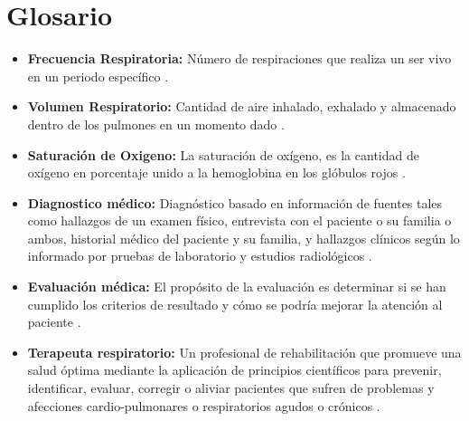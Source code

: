 \documentclass[12pt]{article}
\begin{document}
\newpage


\section*{Glosario}
\begin{itemize}
\item \textbf{Frecuencia Respiratoria:} Número de respiraciones que realiza un ser vivo en un periodo específico \cite{1}. 
\item \textbf{Volumen Respiratorio:} Cantidad de aire inhalado, exhalado y almacenado dentro de los pulmones en un momento dado \cite{2}.
\item \textbf{Saturación de Oxigeno:} La saturación de oxígeno, es la cantidad de oxígeno en porcentaje unido a la hemoglobina en los glóbulos rojos \cite{3}.
\item \textbf{Diagnostico médico:} Diagnóstico basado en información de fuentes tales como hallazgos de un examen físico, entrevista con el paciente o su familia o ambos, historial médico del paciente y su familia, y hallazgos clínicos según lo informado por pruebas de laboratorio y estudios radiológicos \cite{4}.
\item \textbf{Evaluación médica:} El propósito de la evaluación es determinar si se han cumplido los criterios de resultado y cómo se podría mejorar la atención al paciente \cite{4}.
\item \textbf{Terapeuta respiratorio:} Un profesional de rehabilitación que promueve una salud óptima mediante la aplicación de principios científicos para prevenir, identificar, evaluar, corregir o aliviar pacientes que sufren de problemas y afecciones cardio-pulmonares o respiratorios agudos o crónicos \cite{4}.


\end{itemize}
\newpage

\tableofcontents
{}

\end{document}
